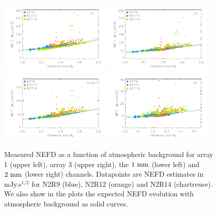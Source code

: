 \begin{figure}
\begin{center}
\includegraphics[clip=true,width=0.47\textwidth]{Figures/NEFD/plot_nefd_vs_obstau_a1.pdf}
\includegraphics[clip=true,width=0.47\textwidth]{Figures/NEFD/plot_nefd_vs_obstau_a3.pdf}
\includegraphics[clip=true,width=0.47\textwidth]{Figures/NEFD/plot_nefd_vs_obstau_1mm.pdf}
\includegraphics[clip=true,width=0.47\textwidth]{Figures/NEFD/plot_nefd_vs_obstau_a2.pdf}
\caption[Measured NEFD versus observed opacity]{Measured NEFD as a function of
  atmospheric background for array 1 (upper left), array 3 (upper right), the
  $1~\rm{mm}$ (lower left) and $2~\rm{mm}$ (lower right) channels. Datapoints
  are NEFD estimates in mJy.s$^{1/2}$ for N2R9 (blue), N2R12 (orange)
  and N2R14 (chartreuse). We also show in the plots the expected NEFD evolution
  with atmospheric background as solid curves.}
\label{fig:nefdvsbackground_below_1Jy}
\end{center}
\end{figure}
 
